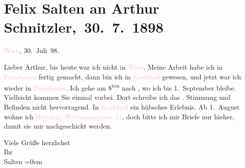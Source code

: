 

\renewcommand{\erwaehnteOrte}{Orte: Bad Reichenhall, Karlsbad, Pressbaum, Salzburg, Wattmanngasse, Wien, Österreich}
\renewcommand{\erwaehnteWerke}{}
\section[ Felix Salten an Arthur Schnitzler, 30. 7. 1898]{Felix Salten an Arthur Schnitzler, 30. 7. 1898}
\nopagebreak{}
\rehead{ }\normalsize\beginnumbering{}
\toendnotes[C]{\smallbreak\pagebreak[2]}
\toendnotes[C]{\smallbreak}
\pstart
           \raggedleft{}{\pb}\textcolor{pink}{Wien}{}\ledrightnote{\textcolor{pink}{Wien}}, 30. Juli 98.\pend
           
\pstart
           Lieber Arthur, bis heute war ich nicht in \textcolor{pink}{Wien}{}\ledrightnote{\textcolor{pink}{Wien}}. Meine
               Arbeit habe ich in \textcolor{pink}{Pressbaum}{}\ledrightnote{\textcolor{pink}{Pressbaum}} fertig gemacht,
               dann bin ich in \textcolor{pink}{Karlsbad}{}\ledrightnote{\textcolor{pink}{Karlsbad}} gewesen, und jetzt war
               ich wieder in \textcolor{pink}{Pressbaum}{}\ledrightnote{\textcolor{pink}{Pressbaum}}. Ich gehe am 8\textsuperscript{ten} nach \label{K_L03280-1v}\label{K_L03280-1h}, wo ich bis 1. September bleibe.
               Vielleicht kommen Sie einmal vorbei. Dort schreibe ich das \label{K_L03280-2v}\label{K_L03280-2h}. Stimmung und Befinden nicht
               hervorragend. In \textcolor{pink}{Karlsbad}{}\ledrightnote{\textcolor{pink}{Karlsbad}} ein hübsches Erlebnis.
               Ab 1. August wohne ich \textcolor{pink}{Hietzing, Wattmanngasse 11}{}\ledrightnote{\textcolor{pink}{Wattmanngasse}}, doch bitte ich mir Briefe nur hieher, damit sie
               mir nachgeschickt werden.\pend
           
\pstart
           {\pb}Viele Grüße herzlichst {\\[\baselineskip]}Ihr {\\[\baselineskip]}\spacefill\mbox{Salten}\pend
           \leftskip=0em{}\endnumbering{}  
      